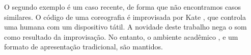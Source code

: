  O segundo exemplo é um caso recente, de forma que não encontramos casos similares. O código de uma coreografia é improvisada por Kate , que controla uma humana com um dispositivo tátil. A novidade deste trabalho nega o som como resultado da improvisação. No entanto, o  ambiente acadêmico \cite{ICLC2015}, e um formato de apresentação tradicional, são mantidos.







